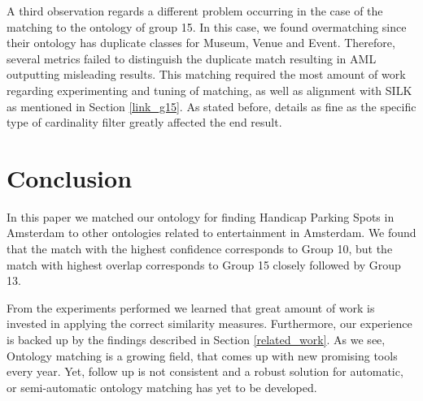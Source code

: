\documentclass[runningheads,a4paper]{../../StyleFiles/llncs}
\begin{document}
A third observation regards a different problem occurring in the case of the matching to the ontology of group 15. In this case, we found overmatching since their ontology has duplicate classes for Museum, Venue and Event. Therefore, several metrics failed to distinguish the duplicate match resulting in AML outputting misleading results. This matching required the most amount of work regarding experimenting and tuning of matching, as well as alignment with SILK as mentioned in Section \ref{link_g15}. As stated before, details as fine as the specific type of cardinality filter greatly affected the end result. 


\section{Conclusion}
In this paper we matched our ontology for finding Handicap Parking Spots in Amsterdam to other ontologies related to entertainment in Amsterdam. We found that the match with the highest confidence corresponds to Group 10, but the match with highest overlap corresponds to Group 15 closely followed by Group 13.

From the experiments performed we learned that great amount of work is invested in applying the correct similarity measures. Furthermore, our experience is backed up by the findings described in Section \ref{related_work}. As we see, Ontology matching is a growing field, that comes up with new promising tools every year. Yet, follow up is not consistent and a robust solution for automatic, or semi-automatic ontology matching has yet to be developed.





\end{document}
